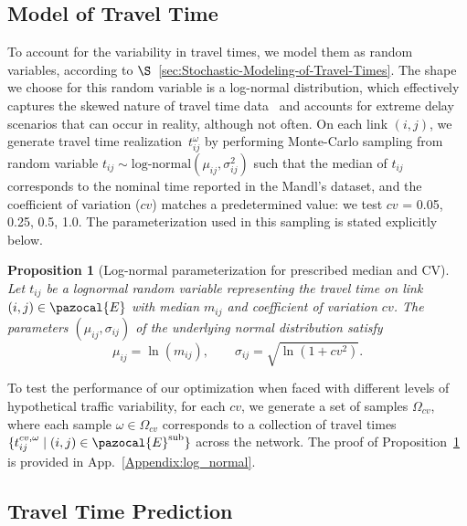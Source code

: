 \documentclass[a4paper,fleqn]{cas-sc}
\newtheorem{proposition}{Proposition}
\begin{document}
\subsection{Model of Travel Time}
\label{sec:log_normal}

To account for the variability in travel times, we model them as random variables, according to $\S$~\ref{sec:Stochastic-Modeling-of-Travel-Times}. The shape we choose for this random variable is a log-normal distribution, which effectively captures the skewed nature of travel time data~\citep{guessous2014estimating} and accounts for extreme delay scenarios that can occur in reality, although not often.
%
On each link $(i,j)$, we generate travel time realization~$t_{ij}^\omega$ by performing Monte-Carlo sampling from random variable $t_{ij} \sim \text{log-normal}(\mu_{ij}, \sigma_{ij}^2)$ such that the median of $t_{ij}$ corresponds to the nominal time reported in the Mandl's dataset, and the coefficient of variation ($cv$) matches a predetermined value: we test $cv$ = 0.05, 0.25, 0.5, 1.0.
The parameterization used in this sampling is stated explicitly below.

\begin{proposition}[Log-normal parameterization for prescribed median and CV]
\label{prop:lognormal}
Let $t_{ij}$ be a lognormal random variable representing the travel time on link $(i,j)\in\pazocal{E}$ with median $m_{ij}$ and coefficient of variation $cv$. The parameters $(\mu_{ij},\sigma_{ij})$ of the underlying normal distribution satisfy
\[
    \mu_{ij} = \ln(m_{ij}), 
    \qquad
    \sigma_{ij} = \sqrt{\ln(1 + cv^{2})}.
\]
\end{proposition}

To test the performance of our optimization when faced with different levels of hypothetical traffic variability, for each $cv$, we generate a set of samples $\Omega_{cv}$, where each sample $\omega \in \Omega_{cv}$ corresponds to a collection of travel times $\{t_{ij}^{cv,\omega} \mid (i,j) \in \pazocal{E}^{\text{sub}}\}$ across the network. The proof of Proposition~\ref{prop:lognormal} is provided in App.~\ref{Appendix:log_normal}.
\subsection{Travel Time Prediction }
\label{sec:KDE}
\end{document}
